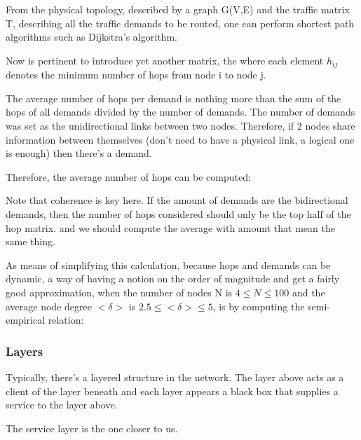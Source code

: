 From the physical topology, described by a graph G(V,E) and the traffic matrix T, describing all the traffic demands to be routed, one can perform shortest path algorithms such as Dijkstra's algorithm.




Now is pertinent to introduce yet another matrix, the  where each element $h_{ij}$ denotes the minimum number of hops from node i to node j.

The average number of hops per demand is nothing more than the sum of the hops of all demands divided by the number of demands. The number of demands was set as the unidirectional links between two nodes. Therefore, if 2 nodes share information between themselves (don't need to have a physical link, a logical one is enough) then there's a demand. 

Therefore, the average number of hops can be computed:


Note that coherence is key here. If the amount of demands are the bidirectional demands, then the number of hops considered should only be the top half of the hop matrix.  and we should compute the average with amount that mean the same thing.


As means of simplifying this calculation, because hops and demands can be dynamic, a way of having a notion on the order of magnitude and get a fairly good approximation, when the number of nodes N is $4 \leq N \leq 100$ and the average node degree $<\delta>$ is $2.5 \leq  <\delta> \leq 5 $, is by computing the semi-empirical relation:




\subsubsection{Layers}

Typically, there's a layered structure in the network. The layer above acts as a client of the layer beneath and each layer appears a black box that supplies a service to the layer above.


The service layer is the one closer to us. 

